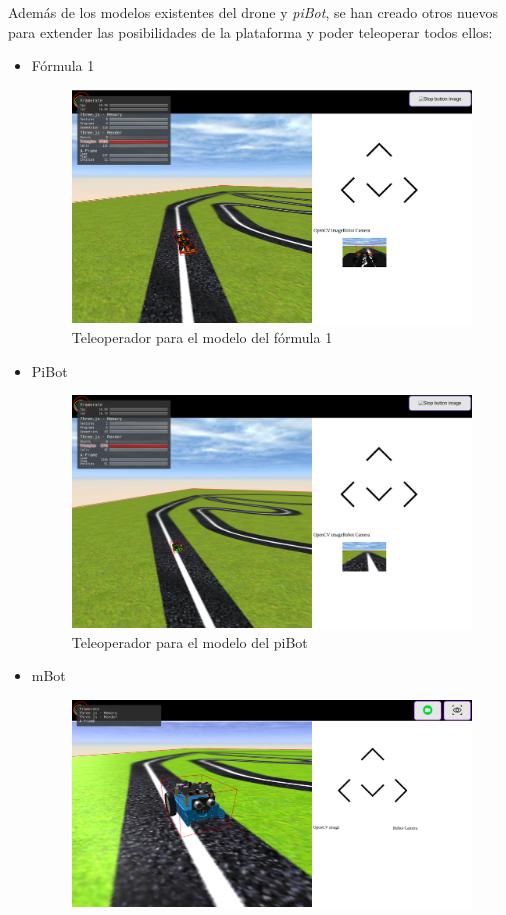 Además de los modelos existentes del drone y \textit{piBot}, se han creado otros nuevos para extender las posibilidades de la plataforma y poder teleoperar todos ellos: 
\begin{itemize}
    \item Fórmula 1
        \begin{figure}[H]
            \centering            \includegraphics[scale=0.35]{img/f1_teleoperator.png}
            \caption{Teleoperador para el modelo del fórmula 1} \label{fig:f1_teleoperator}
        \end{figure}
    \item PiBot 
        \begin{figure}[H]
            \centering            \includegraphics[scale=0.35]{img/pibot_teleoperator.png}
            \caption{Teleoperador para el modelo del piBot} \label{fig:piBot_teleoperator}
        \end{figure}
    \item mBot
          \begin{figure}[H]
            \centering
            \includegraphics[scale=0.3]{img/mBot_teleoperator.png}

\end{figure}
\end{itemize}
